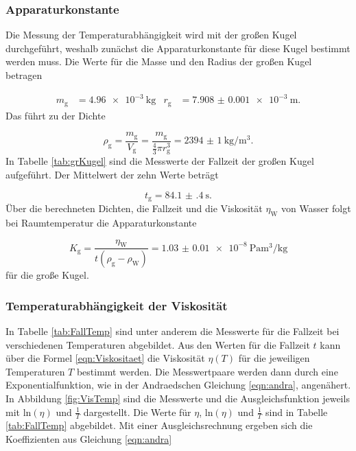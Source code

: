 \subsubsection{Apparaturkonstante}

Die Messung der Temperaturabhängigkeit wird mit der großen Kugel durchgeführt,
weshalb zunächst die Apparaturkonstante für diese Kugel bestimmt werden muss.
Die Werte für die Masse und den Radius der großen Kugel betragen

\begin{align}
  m_\text{g} & = \SI{4.96e-3}{\kilo\gram} & r_\text{g} & =
  \SI{7.908(1)e-3}{\meter}.
\end{align}
Das führt zu der Dichte

\begin{equation}
  \rho_\text{g} = \frac{m_\text{g}}{V_\text{g}} = \frac{m_\text{g}}
  {\frac{4}{3}\pi r_\text{g}^3} = \SI{2394(1)}{\kilo\gram\per\cubic\meter}.
  \label{eqn:rhog}
\end{equation}
In Tabelle \ref{tab:grKugel} sind die Messwerte der Fallzeit der großen
Kugel aufgeführt. Der Mittelwert der zehn Werte beträgt

\begin{equation}
  t_\text{g} = \SI{84.1(4)}{\second}.
\end{equation}
Über die berechneten Dichten, die Fallzeit und die Viskosität $\eta_\text{W}$
von Wasser folgt bei Raumtemperatur die Apparaturkonstante

\begin{equation}
  K_\text{g} = \frac{\eta_\text{W}}{t(\rho_\text{g}-\rho_\text{W})}
  = \SI{1.03(1)e-8}{\pascal\cubic\meter\per\kilo\gram}
\end{equation}
für die große Kugel.

\subsubsection{Temperaturabhängigkeit der Viskosität}

In Tabelle \ref{tab:FallTemp} sind unter anderem die Messwerte für die Fallzeit
bei verschiedenen Temperaturen abgebildet.
Aus den Werten für die Fallzeit $t$ kann über die Formel \eqref{eqn:Viskositaet}
die Viskosität $\eta(T)$ für die jeweiligen Temperaturen $T$ bestimmt werden.
Die Messwertpaare werden dann durch eine Exponentialfunktion, wie in der
Andraedschen Gleichung \eqref{eqn:andra}, angenähert.
In Abbildung \ref{fig:VisTemp} sind die Messwerte und die Ausgleichsfunktion
jeweils mit ln$(\eta)$ und $\frac{1}{T}$ dargestellt.
Die Werte für $\eta$, ln$(\eta)$ und $\frac{1}{T}$ sind in Tabelle
\ref{tab:FallTemp} abgebildet.
Mit einer Ausgleichsrechnung ergeben sich die Koeffizienten aus Gleichung
\eqref{eqn:andra}

